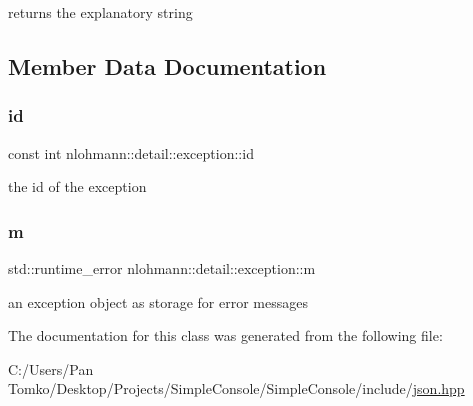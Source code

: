 returns the explanatory string 



\subsection{Member Data Documentation}
\mbox{\label{classnlohmann_1_1detail_1_1exception_a0d4589a3fb54e81646d986c05efa3b9a}} 
\subsubsection{\texorpdfstring{id}{id}}
{\footnotesize\ttfamily const int nlohmann\+::detail\+::exception\+::id}



the id of the exception 

\mbox{\label{classnlohmann_1_1detail_1_1exception_ad54778dc4f125488cbce8ec276dfdde2}} 
\subsubsection{\texorpdfstring{m}{m}}
{\footnotesize\ttfamily std\+::runtime\+\_\+error nlohmann\+::detail\+::exception\+::m\hspace{0.3cm}{\ttfamily [private]}}



an exception object as storage for error messages 



The documentation for this class was generated from the following file\+:\begin{DoxyCompactItemize}
\item 
C\+:/\+Users/\+Pan Tomko/\+Desktop/\+Projects/\+Simple\+Console/\+Simple\+Console/include/\mbox{\hyperlink{json_8hpp}{json.\+hpp}}\end{DoxyCompactItemize}
